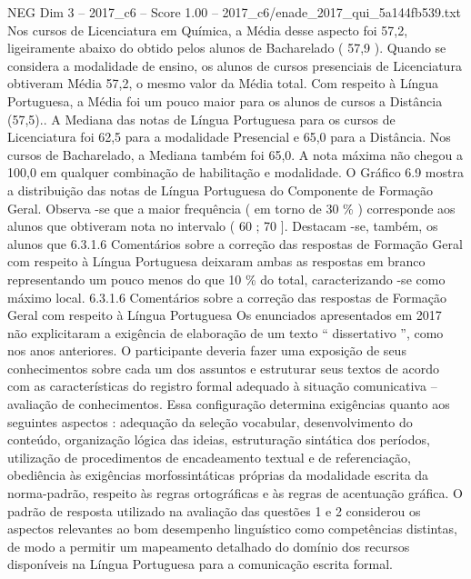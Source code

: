 \begin{textsample}{NEG Dim 3 – 2017\_c6 – Score 1.00 – 2017\_c6/enade\_2017\_qui\_5a144fb539.txt}
Nos cursos de Licenciatura em Química, a Média desse aspecto foi 57,2, ligeiramente abaixo do obtido pelos alunos de Bacharelado ( 57,9 ).
Quando se considera a modalidade de ensino, os alunos de cursos presenciais de Licenciatura obtiveram Média 57,2, o mesmo valor da Média total.
Com respeito à Língua Portuguesa, a Média foi um pouco maior para os alunos de cursos a Distância (57,5)..
A Mediana das notas de Língua Portuguesa para os cursos de Licenciatura foi 62,5 para a modalidade Presencial e 65,0 para a Distância.
Nos cursos de Bacharelado, a Mediana também foi 65,0.
A nota máxima não chegou a 100,0 em qualquer combinação de habilitação e modalidade.
O Gráfico 6.9 mostra a distribuição das notas de Língua Portuguesa do Componente de Formação Geral.
Observa -se que a maior frequência ( em torno de 30 \% ) corresponde aos alunos que obtiveram nota no intervalo ( 60 ; 70 ].
Destacam -se, também, os alunos que 6.3.1.6 Comentários sobre a correção das respostas de Formação Geral com respeito à Língua Portuguesa deixaram ambas as respostas em branco representando um pouco menos do que 10 \% do total, caracterizando -se como máximo local. 6.3.1.6 Comentários sobre a correção das respostas de Formação Geral com respeito à Língua Portuguesa Os enunciados apresentados em 2017 não explicitaram a exigência de elaboração de um texto “ dissertativo ”, como nos anos anteriores.
O participante deveria fazer uma exposição de seus conhecimentos sobre cada um dos assuntos e estruturar seus textos de acordo com as características do registro formal adequado à situação comunicativa – avaliação de conhecimentos.
Essa configuração determina exigências quanto aos seguintes aspectos : adequação da seleção vocabular, desenvolvimento do conteúdo, organização lógica das ideias, estruturação sintática dos períodos, utilização de procedimentos de encadeamento textual e de referenciação, obediência às exigências morfossintáticas próprias da modalidade escrita da norma-padrão, respeito às regras ortográficas e às regras de acentuação gráfica.
O padrão de resposta utilizado na avaliação das questões 1 e 2 considerou os aspectos relevantes ao bom desempenho linguístico como competências distintas, de modo a permitir um mapeamento detalhado do domínio dos recursos disponíveis na Língua Portuguesa para a comunicação escrita formal.

\end{textsample}
